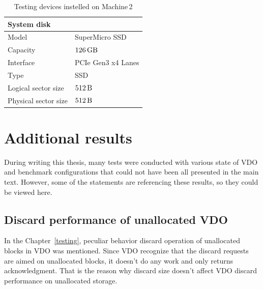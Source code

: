 \documentclass[
  color, %
  table, %
  lof,   %
  lot,   %
]{fithesis3}
\begin{document}
\begin{table}
\begin{tabular}{|l|l|}
    \hline
    \multicolumn{2}{|l|}{System disk} \\ \hline %
    Model & SuperMicro SSD  \\
    \hline
    Capacity & $\SI{126}{\giga\byte}$  \\
    \hline
    Interface & PCIe Gen3 x4 Lanes  \\
    \hline
    Type & SSD \\
    \hline    
   Logical sector size & $\SI{512}{\byte}$ \\    
    \hline    
    Physical sector size & $\SI{512}{\byte}$ \\
    \hline   
\end{tabular}
\caption{Testing devices instelled on Machine\,2}
\end{table}

\clearpage
\section{Additional results}
During writing this thesis, many tests were conducted with various state of VDO and benchmark configurations that could not have been all presented in the main text. However, some of the statements are referencing these results, so they could be viewed here.

\subsection{Discard performance of unallocated VDO}
In the Chapter~\ref{testing}, peculiar behavior discard operation of unallocated blocks in VDO was mentioned. Since VDO recognize that the discard requests are aimed on unallocated blocks, it doesn't do any work and only returns acknowledgment. That is the reason why discard size doesn't affect VDO discard performance on unallocated storage.
\end{document}
